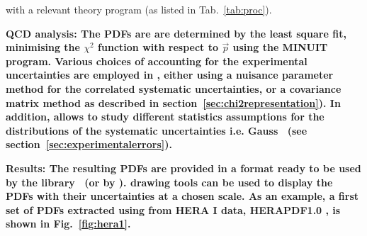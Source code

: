 \begin{description}
with a relevant theory program (as listed in Tab.~\ref{tab:proc}).
\item
\bf{QCD analysis:} \rm  
The PDFs are 
are determined by the least square fit, minimising the $\chi^2$ function with respect to $\vec{p}$
using the MINUIT~\cite{minuit} program.
Various choices of accounting for the experimental uncertainties are employed in \fitter, either using 
a nuisance parameter method for the correlated systematic uncertainties, 
or a covariance matrix method as described in section~\ref{sec:chi2representation}). In addition, \fitter allows to study different statistics 
assumptions for the distributions of the systematic uncertainties i.e. Gauss~\cite{hera-lhc:report2009} (see section~\ref{sec:experimentalerrors}).
%
%
\item
\bf{Results:} \rm 
The resulting PDFs are provided in a format ready to be used by the \lhapdf 
library~\cite{lhapdf,lhapdfweb} (or by \tmdlib \cite{tmdlref}).
\fitter drawing tools can be used to display the PDFs with their uncertainties at a chosen scale.  
As an example, a first set of PDFs extracted using \fitter from HERA I data, HERAPDF1.0 \cite{h1zeus:2009wt}, 
is shown in Fig.~\ref{fig:hera1}.

\end{description}
